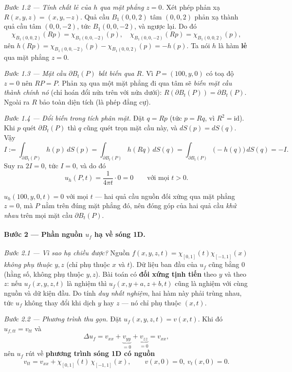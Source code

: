 \emph{Bước 1.2 --- Tính chất lẻ của $h$ qua mặt phẳng $z=0$.} Xét phép phản xạ $R(x,y,z)=(x,y,-z)$. Quả cầu $B_1(0,0,2)$ tâm $(0,0,2)$ phản xạ thành quả cầu tâm $(0,0,-2)$, tức $B_1(0,0,-2)$, và ngược lại. Do đó
\[
  \chi_{B_1(0,0,2)}(Rp)=\chi_{B_1(0,0,-2)}(p),\quad
  \chi_{B_1(0,0,-2)}(Rp)=\chi_{B_1(0,0,2)}(p),
\]
nên $h(Rp)=\chi_{B_1(0,0,-2)}(p)-\chi_{B_1(0,0,2)}(p)=-h(p)$. Ta nói $h$ là hàm \textbf{lẻ} qua mặt phẳng $z=0$.

\emph{Bước 1.3 --- Mặt cầu $\partial B_t(P)$ bất biến qua $R$.} Vì $P=(100,y,0)$ có toạ độ $z=0$ nên $RP=P$. Phản xạ qua một mặt phẳng đi qua tâm sẽ \emph{biến mặt cầu thành chính nó} (chỉ hoán đổi nửa trên với nửa dưới): $R(\partial B_t(P))=\partial B_t(P)$. Ngoài ra $R$ bảo toàn diện tích (là phép đẳng cự).

\emph{Bước 1.4 --- Đổi biến trong tích phân mặt.} Đặt $q=R p$ (tức $p=R q$, vì $R^2=\mathrm{id}$). Khi $p$ quét $\partial B_t(P)$ thì $q$ cũng quét trọn mặt cầu này, và $dS(p)=dS(q)$. Vậy
\[
  I:=\int_{\partial B_t(P)} h(p)\,dS(p)
   =\int_{\partial B_t(P)} h(Rq)\,dS(q)
   =\int_{\partial B_t(P)} \big(-h(q)\big)\,dS(q)=-I.
\]
Suy ra $2I=0$, tức $I=0$, và do đó
\[
  u_h(P,t)=\frac{1}{4\pi t}\cdot 0=0\qquad\text{với mọi }t>0.
\]
\begin{nhobox}
$u_h(100,y,0,t)=0$ với mọi $t$ --- hai quả cầu nguồn đối xứng qua mặt phẳng $z=0$, mà $P$ nằm trên đúng mặt phẳng đó, nên đóng góp của hai quả cầu \emph{khử nhau} trên mọi mặt cầu $\partial B_t(P)$.
\end{nhobox}

\paragraph{Bước 2 --- Phần nguồn $u_f$ hạ về sóng 1D.}\leavevmode

\emph{Bước 2.1 --- Vì sao hạ chiều được?} Nguồn $f(x,y,z,t)=\chi_{[0,1]}(t)\chi_{[-1,1]}(x)$ \emph{không phụ thuộc $y,z$} (chỉ phụ thuộc $x$ và $t$). Dữ liệu ban đầu của $u_f$ cũng bằng $0$ (hằng số, không phụ thuộc $y,z$). Bài toán có \textbf{đối xứng tịnh tiến} theo $y$ và theo $z$: nếu $u_f(x,y,z,t)$ là nghiệm thì $u_f(x,y+a,z+b,t)$ cũng là nghiệm với cùng nguồn và dữ kiện đầu. Do tính \emph{duy nhất nghiệm}, hai hàm này phải trùng nhau, tức $u_f$ không thay đổi khi dịch $y$ hay $z$ --- nó chỉ phụ thuộc $(x,t)$.

\emph{Bước 2.2 --- Phương trình thu gọn.} Đặt $u_f(x,y,z,t)=v(x,t)$. Khi đó $u_{f,tt}=v_{tt}$ và
\[
  \Delta u_f=v_{xx}+\underbrace{v_{yy}}_{=0}+\underbrace{v_{zz}}_{=0}=v_{xx},
\]
nên $u_f$ rút về \textbf{phương trình sóng 1D có nguồn}
\[
  v_{tt}=v_{xx}+\chi_{[0,1]}(t)\,\chi_{[-1,1]}(x),\qquad v(x,0)=0,\ v_t(x,0)=0.
\]

